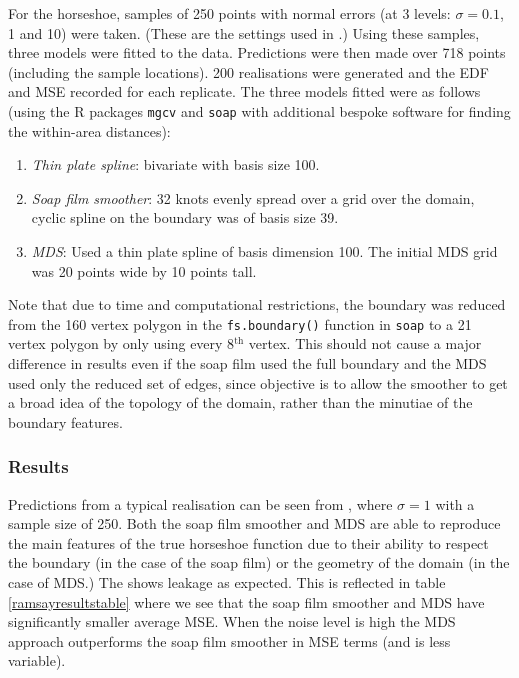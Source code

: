 For the horseshoe, samples of 250 points with normal errors (at 3 levels:  $\sigma= 0.1$, 1 and 10) were taken. (These are the settings used in \cite{soap}.) Using these samples, three models were fitted to the data. Predictions were then made over 718 points (including the sample locations). 200 realisations were generated and the EDF and MSE recorded for each replicate. The three models fitted were as follows (using the \textsf{R} packages \texttt{mgcv} and \texttt{soap} with additional bespoke software for finding the within-area distances):

\begin{enumerate}
\item \emph{Thin plate spline}: bivariate \tprs with basis size 100.
\item \emph{Soap film smoother}: 32 knots evenly spread over a grid over the domain, cyclic spline on the boundary was of basis size 39.
\item \emph{MDS}: Used a thin plate spline of basis dimension 100. The initial MDS grid was 20 points wide by 10 points tall.
\end{enumerate} 

Note that due to time and computational restrictions, the boundary was reduced from the 160 vertex polygon in the \texttt{fs.boundary()} function in \texttt{soap} to a 21 vertex polygon by only using every 8$^\text{th}$ vertex. This should not cause a major difference in results even if the soap film used the full boundary and the MDS used only the reduced set of edges, since objective is to allow the smoother to get a broad idea of the topology of the domain, rather than the minutiae of the boundary features.

\subsubsection{Results}

Predictions from a typical realisation can be seen from , where $\sigma=1$ with a sample size of 250. Both the soap film smoother and MDS are able to reproduce the main features of the true horseshoe function due to their ability to respect the boundary (in the case of the soap film) or the geometry of the domain (in the case of MDS.) The \tprs shows leakage as expected. This is reflected in table \ref{ramsayresultstable} where we see that the soap film smoother and MDS have significantly smaller average MSE. When the noise level is high the MDS approach outperforms the soap film smoother in MSE terms (and is less variable).

